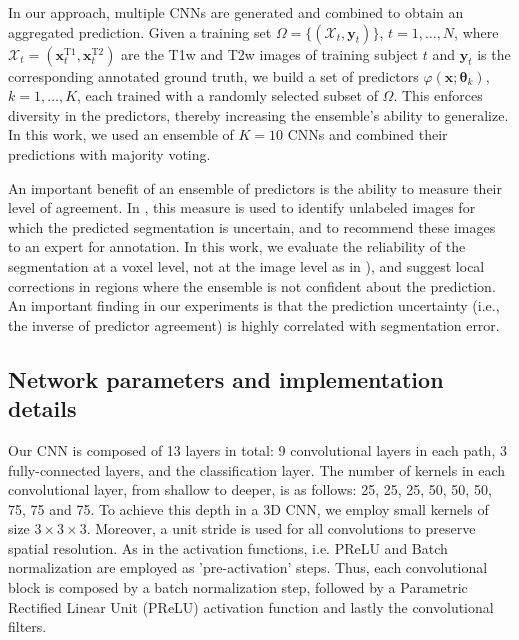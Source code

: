 \documentclass[twoside,espcrc2]{elsarticle}
\newcommand{\mr}[1]{\mathrm{#1}}
\newcommand{\vold}[1]{$#1\!\times\!#1\!\times\!#1$}
\renewcommand{\vec}[1]{\mathbf{#1}}
\newcommand{\xx}{\vec x}
\newcommand{\yy}{\vec y}
\newcommand{\vt}{\boldsymbol{\theta}}
\begin{document}
In our approach, multiple CNNs are generated and combined to obtain an aggregated prediction. Given a training set $\Omega = \{ (\mathcal{X}_t, \yy_t)\}$, $t = 1,\ldots,N$, where $\mathcal{X}_t = (\xx^\mr{T1}_t, \xx^\mr{T2}_t)$ are the T1w and T2w images of training subject $t$ and $\yy_t$ is the corresponding annotated ground truth, we build a set of predictors $\varphi(\xx; \vt_k)$, $k = 1, \ldots, K$, each trained with a randomly selected subset of $\Omega$. This enforces diversity in the predictors, thereby increasing the ensemble's ability to generalize. In this work, we used an ensemble of $K=10$ CNNs and combined their predictions with majority voting. 

An important benefit of an ensemble of predictors is the ability to measure their level of agreement. In \cite{yang2017suggestive}, this measure is used to identify unlabeled images for which the predicted segmentation is uncertain, and to recommend these images to an expert for annotation. In this work, we evaluate the reliability of the segmentation at a voxel level, not at the image level as in \cite{yang2017suggestive}), and suggest local corrections in regions where the ensemble is not confident about the prediction. An important finding in our experiments is that the prediction uncertainty (i.e., the inverse of predictor agreement) is highly correlated with segmentation error.
 
\subsection{Network parameters and implementation details} 

Our CNN is composed of 13 layers in total: 9 convolutional layers in each path, 3 fully-connected layers, and the classification layer. The number of kernels in each convolutional layer, from shallow to deeper, is as follows: 25, 25, 25, 50, 50, 50, 75, 75 and 75. To achieve this depth in a 3D CNN, we employ small kernels of size \vold{3}. Moreover, a unit stride is used for all convolutions to preserve spatial resolution. As in \cite{he2016identity} the activation functions, i.e. PReLU and Batch normalization are employed as 'pre-activation' steps. Thus, each convolutional block is composed by a batch normalization step, followed by a Parametric Rectified Linear Unit (PReLU) activation function and lastly the convolutional filters.
\end{document}
